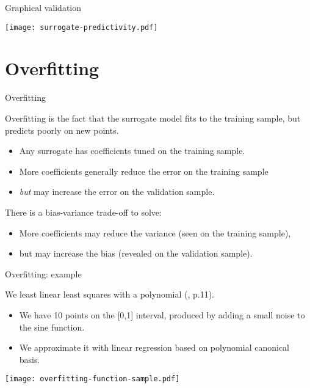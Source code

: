 \documentclass{beamer}
\begin{document}

\begin{frame}[t]{Graphical validation}

\begin{center}
 \texttt{[image: surrogate-predictivity.pdf]}
\end{center}

\end{frame}

\section{Overfitting}

\begin{frame}[t]{Overfitting}

Overfitting is the fact that the surrogate model fits to the 
training sample, but predicts poorly on new points. 

\begin{itemize}
\item Any surrogate has coefficients tuned on the training sample.
\item More coefficients generally reduce the error on the training sample 
\item \emph{but} may increase the error on the validation sample.
\end{itemize}

There is a bias-variance trade-off to solve:
\begin{itemize}
\item More coefficients may reduce the variance (seen on the training sample), 
\item but may increase the bias (revealed on the validation sample).
\end{itemize}

\end{frame}
%

\begin{frame}[t]{Overfitting: example}

\begin{example}
We least linear least squares with a polynomial (\cite{bishop1995neural}, 
p.11). 
\begin{itemize}
\item We have 10 points on the [0,1] interval, produced by 
adding a small noise to the sine function. 
\item We approximate it with linear regression based on polynomial 
canonical basis.
\end{itemize}
\end{example}

\begin{center}
 \texttt{[image: overfitting-function-sample.pdf]}
\end{center}

\end{frame}
\end{document}
